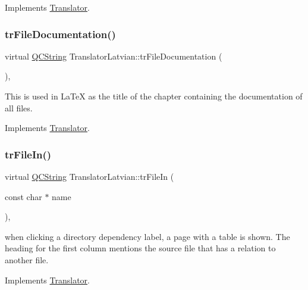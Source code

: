 Implements \mbox{\hyperlink{class_translator}{Translator}}.

\mbox{\label{class_translator_latvian_a2706102bd6adf31030e1b290e3799b9c}} 
\subsubsection{\texorpdfstring{trFileDocumentation()}{trFileDocumentation()}}
{\footnotesize\ttfamily virtual \mbox{\hyperlink{class_q_c_string}{Q\+C\+String}} Translator\+Latvian\+::tr\+File\+Documentation (\begin{DoxyParamCaption}{ }\end{DoxyParamCaption})\hspace{0.3cm}{\ttfamily [inline]}, {\ttfamily [virtual]}}

This is used in La\+TeX as the title of the chapter containing the documentation of all files. 

Implements \mbox{\hyperlink{class_translator}{Translator}}.

\mbox{\label{class_translator_latvian_ad4d105640d73e7be66bec587d70329eb}} 
\subsubsection{\texorpdfstring{trFileIn()}{trFileIn()}}
{\footnotesize\ttfamily virtual \mbox{\hyperlink{class_q_c_string}{Q\+C\+String}} Translator\+Latvian\+::tr\+File\+In (\begin{DoxyParamCaption}\item[{const char $\ast$}]{name }\end{DoxyParamCaption})\hspace{0.3cm}{\ttfamily [inline]}, {\ttfamily [virtual]}}

when clicking a directory dependency label, a page with a table is shown. The heading for the first column mentions the source file that has a relation to another file. 

Implements \mbox{\hyperlink{class_translator}{Translator}}.

\mbox{\label{class_translator_latvian_a99bd39bea975f6df9f40c792b0b50f48}} 
